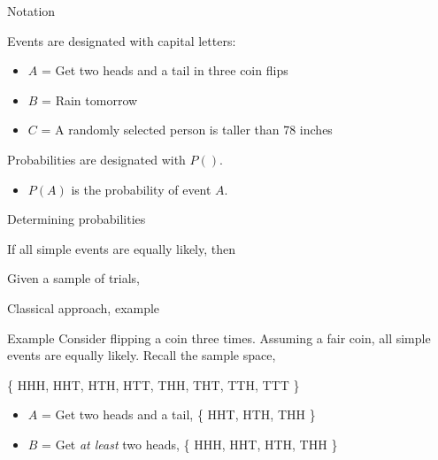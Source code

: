 \documentclass[xcolor=table, aspectratio=169, bigger]{beamer}
\begin{document}
\begin{frame}{Notation}
\begin{block}{}
Events are designated with capital letters:
\pause
\begin{itemize}
\item $A$ = Get two heads and a tail in three coin flips
\item $B$ = Rain tomorrow
\item $C$ = A randomly selected person is taller than 78 inches
\end{itemize}
\end{block}

\pause
\begin{block}{}
Probabilities are designated with $P()$.
\pause
\begin{itemize}
\item $P(A)$ is the probability of event $A$.
\end{itemize}
\end{block}
\end{frame}

\begin{frame}{Determining probabilities}
\begin{block}{}
 If all simple events are equally likely, then\\
\medskip
{}
\end{block}

\pause

\begin{block}{}
 Given a sample of trials,\\
\medskip
{} 
\end{block}

\end{frame}

\begin{frame}{Classical approach, example}
\begin{exampleblock}{Example}
Consider flipping a coin three times. Assuming a fair coin, all simple events are equally likely. Recall the sample space,\\
\smallskip
{\centering
\{ HHH, HHT, HTH, HTT, THH, THT, TTH, TTT \} \par
}
\begin{itemize}
\pause
\item $A$ = Get two heads and a tail, \{ HHT, HTH, THH \}
\pause
\\

\pause
\item $B$ = Get \emph{at least} two heads,  \{ HHH,  HHT, HTH, THH \}
\pause
\\
\end{itemize}
\end{exampleblock}
\end{frame}
\end{document}
